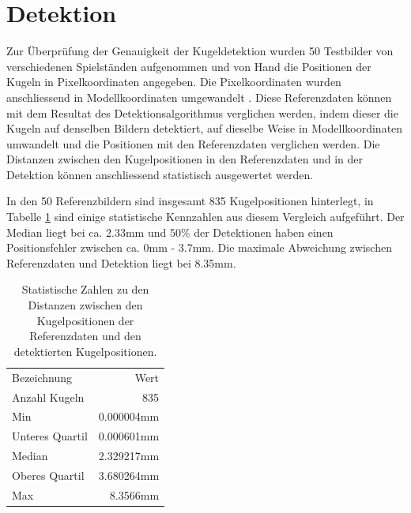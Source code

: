 \section{Detektion}
Zur Überprüfung der Genauigkeit der Kugeldetektion wurden 50 Testbilder von verschiedenen Spielständen aufgenommen
und von Hand die Positionen der Kugeln in Pixelkoordinaten angegeben.
Die Pixelkoordinaten wurden anschliessend in Modellkoordinaten umgewandelt \cite{project2:pixel_to_model_coordinates}.
Diese Referenzdaten können mit dem Resultat des Detektionsalgorithmus verglichen werden,
indem dieser die Kugeln auf denselben Bildern detektiert, auf dieselbe Weise in Modellkoordinaten umwandelt und
die Positionen mit den Referenzdaten verglichen werden.
Die Distanzen zwischen den Kugelpositionen in den Referenzdaten und in der Detektion können
anschliessend statistisch ausgewertet werden.

In den 50 Referenzbildern sind insgesamt 835 Kugelpositionen hinterlegt, in Tabelle \ref{tab:detektion_resultate_distanzen_stats}
sind einige statistische Kennzahlen aus diesem Vergleich aufgeführt. Der Median liegt bei ca. 2.33mm und 50\% der Detektionen
haben einen Positionsfehler zwischen ca. 0mm - 3.7mm. Die maximale Abweichung zwischen Referenzdaten und Detektion liegt bei 8.35mm.


\begin{table}[ht]
    \begin{tabular}{ lr }
        \rowcolor{\seccolor!50}
        Bezeichnung & Wert\\
        Anzahl Kugeln & 835\\
        Min & 0.000004mm\\
        Unteres Quartil & 0.000601mm\\
        Median & 2.329217mm\\
        Oberes Quartil & 3.680264mm\\
        Max & 8.3566mm
    \end{tabular}
    \caption{Statistische Zahlen zu den Distanzen zwischen den Kugelpositionen der Referenzdaten und den detektierten Kugelpositionen.}
    \label{tab:detektion_resultate_distanzen_stats}
\end{table}


